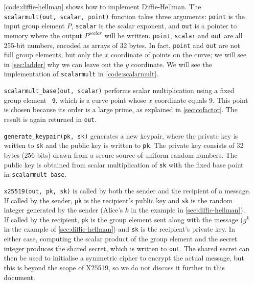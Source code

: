 \documentclass[manuscript]{acmart}
\begin{document}
\autoref{code:diffie-hellman} shows how to implement Diffie-Hellman.
The \verb|scalarmult(out, scalar, point)| function takes three arguments: \verb|point| is the input group element $P$, \verb|scalar| is the scalar exponent, and \verb|out| is a pointer to memory where the output $P^\mathit{scalar}$ will be written.
\verb|point|, \verb|scalar| and \verb|out| are all 255-bit numbers, encoded as arrays of 32 bytes.
In fact, \verb|point| and \verb|out| are not full group elements, but only the $x$ coordinate of points on the curve; we will see in \autoref{sec:ladder} why we can leave out the $y$ coordinate.
We will see the implementation of \verb|scalarmult| in \autoref{code:scalarmult}.

\verb|scalarmult_base(out, scalar)| performs scalar multiplication using a fixed group element \verb|_9|, which is a curve point whose $x$ coordinate equals 9.
This point is chosen because its order is a large prime, as explained in \autoref{sec:cofactor}.
The result is again returned in \verb|out|.

\verb|generate_keypair(pk, sk)| generates a new keypair, where the private key is written to \verb|sk| and the public key is written to \verb|pk|.
The private key consists of 32 bytes (256 bits) drawn from a secure source of uniform random numbers.
The public key is obtained from scalar multiplication of \verb|sk| with the fixed base point in \verb|scalarmult_base|.

\verb|x25519(out, pk, sk)| is called by both the sender and the recipient of a message.
If called by the sender, \verb|pk| is the recipient's public key and \verb|sk| is the random integer generated by the sender (Alice's $k$ in the example in \autoref{sec:diffie-hellman}).
If called by the recipient, \verb|pk| is the group element sent along with the message ($g^k$ in the example of \autoref{sec:diffie-hellman}) and \verb|sk| is the recipient's private key.
In either case, computing the scalar product of the group element and the secret integer produces the shared secret, which is written to \verb|out|.
The shared secret can then be used to initialise a symmetric cipher to encrypt the actual message, but this is beyond the scope of X25519, so we do not discuss it further in this document.
\end{document}
